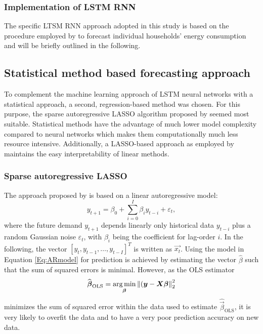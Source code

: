 \subsubsection{Implementation of LSTM RNN}

The specific LTSM RNN approach adopted in this study is based on the procedure employed by \citet{Shi:2017} to forecast individual households' energy consumption and will be briefly outlined in the following. 




\subsection{Statistical method based forecasting approach} \label{Sec:Method;Subsec:LASSO}

To complement the machine learning approach of LSTM neural networks with a statistical approach, a second, regression-based method was chosen. For this purpose, the sparse autoregressive LASSO algorithm proposed by \citet{Li:2017} seemed most suitable. Statistical methods have the advantage of much lower model complexity compared to neural networks which makes them computationally much less resource intensive. Additionally, a LASSO-based approach as employed by \citet{Li:2017} maintains the easy interpretability of linear methods.



\subsubsection{Sparse autoregressive LASSO}

The approach proposed by \citet{Li:2017} is based on a linear autoregressive model:
%
\begin{equation} \label{Eq:ARmodel}
    y_{t+1}=\beta_0+\sum_{i=0}^I\beta_iy_{t-i}+\varepsilon_t,
\end{equation}
%
where the future demand $y_{t+1}$ depends linearly only historical data $y_{t-i}$ plus a random Gaussian noise $\varepsilon_t$, with $\beta_i$ being the coefficient for lag-order $i$. In the following, the vector $\left[y_t, y_{t-1}, \dots, y_{t-I}\right]^T$ is written as $\vec{x_t}$. Using the model in Equation \ref{Eq:ARmodel} for prediction is achieved by estimating the vector $\widehat{\beta}$ such that the sum of squared errors is minimal. However, as the OLS estimator
%
\begin{equation} \label{Eq:betaOLS}
    \widehat{\boldsymbol{\beta}}_{\text{OLS}}=\operatorname*{\arg\min}_{\boldsymbol{\beta}}\left\lVert(\boldsymbol{y}-\boldsymbol{X}\boldsymbol{\beta}\right\rVert^2_2
\end{equation}
%
minimizes the sum of squared error within the data used to estimate $\widehat{\vec{\beta}}_{\text{OLS}}$, it is very likely to overfit the data and to have a very poor prediction accuracy on new data.

